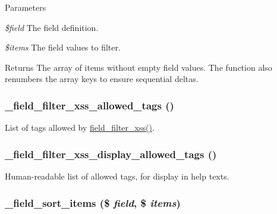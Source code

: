 \begin{DoxyParams}{Parameters}
\item[{\em \$field}]The field definition. \item[{\em \$items}]The field values to filter.\end{DoxyParams}
\begin{DoxyReturn}{Returns}
The array of items without empty field values. The function also renumbers the array keys to ensure sequential deltas. 
\end{DoxyReturn}
\hypertarget{group__field_ga7ae8de4fae20a2142bb4c8d1e007cda5}{
\subsubsection[{\_\-field\_\-filter\_\-xss\_\-allowed\_\-tags}]{\setlength{\rightskip}{0pt plus 5cm}\_\-field\_\-filter\_\-xss\_\-allowed\_\-tags ()}}
\label{group__field_ga7ae8de4fae20a2142bb4c8d1e007cda5}
List of tags allowed by \hyperlink{group__field_ga181095248684b8b5a45c08ab8d22a813}{field\_\-filter\_\-xss()}. \hypertarget{group__field_ga047cdec864ecb94587790aa3ed5fbd18}{
\subsubsection[{\_\-field\_\-filter\_\-xss\_\-display\_\-allowed\_\-tags}]{\setlength{\rightskip}{0pt plus 5cm}\_\-field\_\-filter\_\-xss\_\-display\_\-allowed\_\-tags ()}}
\label{group__field_ga047cdec864ecb94587790aa3ed5fbd18}
Human-\/readable list of allowed tags, for display in help texts. \hypertarget{group__field_ga8ce2774a8371d5435ef06e13bfc93246}{
\subsubsection[{\_\-field\_\-sort\_\-items}]{\setlength{\rightskip}{0pt plus 5cm}\_\-field\_\-sort\_\-items (\$ {\em field}, \/  \$ {\em items})}}
